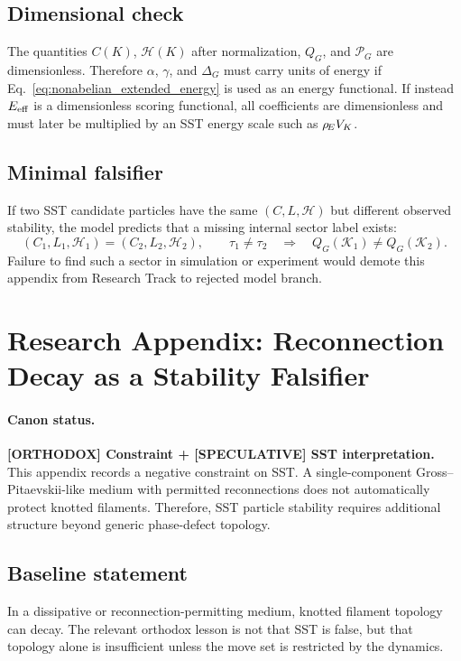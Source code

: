 \subsection{Dimensional check}
The quantities $C(K)$, $\mathcal H(K)$ after normalization, $Q_G$, and $\mathcal P_G$ are dimensionless. Therefore $\alpha$, $\gamma$, and $\Delta_G$ must carry units of energy if Eq.~\eqref{eq:nonabelian_extended_energy} is used as an energy functional. If instead $E_{\rm eff}$ is a dimensionless scoring functional, all coefficients are dimensionless and must later be multiplied by an SST energy scale such as $\rho_{\!E} V_K$.

\subsection{Minimal falsifier}
If two SST candidate particles have the same $(C,L,\mathcal H)$ but different observed stability, the model predicts that a missing internal sector label exists:
\begin{equation}
    (C_1,L_1,\mathcal H_1)=(C_2,L_2,\mathcal H_2),
    \qquad
    \tau_1\neq \tau_2
    \quad\Rightarrow\quad
    Q_G(\mathcal K_1)\neq Q_G(\mathcal K_2).
\end{equation}
Failure to find such a sector in simulation or experiment would demote this appendix from Research Track to rejected model branch.

\section{Research Appendix: Reconnection Decay as a Stability Falsifier}
\label{app:reconnection_decay_falsifier}

\paragraph{Canon status.}
\textbf{[ORTHODOX] Constraint + [SPECULATIVE] SST interpretation.}
This appendix records a negative constraint on SST. A single-component Gross--Pitaevskii-like medium with permitted reconnections does not automatically protect knotted filaments. Therefore, SST particle stability requires additional structure beyond generic phase-defect topology.

\subsection{Baseline statement}
In a dissipative or reconnection-permitting medium, knotted filament topology can decay. The relevant orthodox lesson is not that SST is false, but that topology alone is insufficient unless the move set is restricted by the dynamics.

